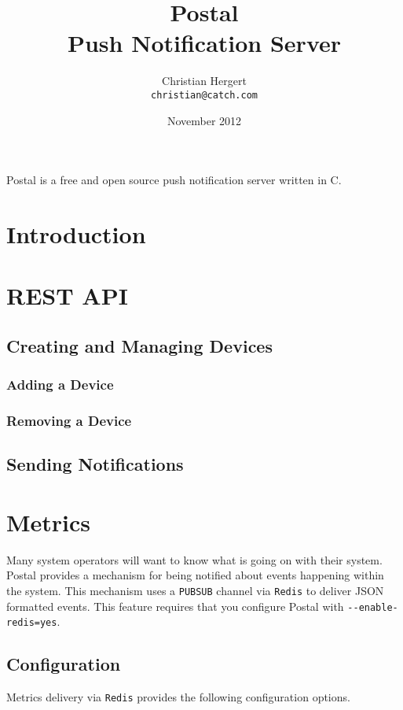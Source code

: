 \documentclass[12pt]{article}
\title{Postal \\ Push Notification Server}
\author{Christian Hergert \\
    \small \texttt{christian@catch.com}
}
\date{November 2012}
\begin{document}
\maketitle

Postal is a free and open source push notification server written in C.

\section{Introduction}

\section{REST API}

\subsection{Creating and Managing Devices}

\subsubsection{Adding a Device}

\subsubsection{Removing a Device}

\subsection{Sending Notifications}

\section{Metrics}

Many system operators will want to know what is going on with their system.
Postal provides a mechanism for being notified about events happening within the system.
This mechanism uses a \verb|PUBSUB| channel via \verb|Redis| to deliver JSON formatted events.
This feature requires that you configure Postal with \verb|--enable-redis=yes|.

\subsection{Configuration}

Metrics delivery via \verb|Redis| provides the following configuration options.
\end{document}
